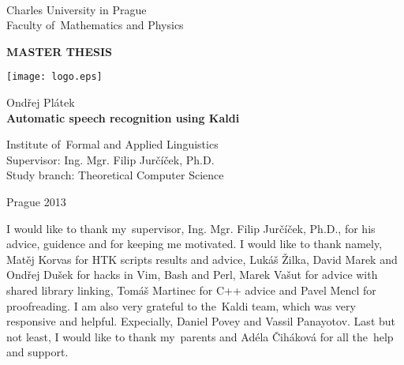 
\begin{titlepage}
\begin{center}
\ \\

\vspace{15mm}

\large
Charles University in Prague\\
Faculty of~Mathematics and Physics\\

\vspace{5mm}

{\Large\bf MASTER THESIS}

\vspace{15mm}

\texttt{[image: logo.eps]} %

\vspace{20mm}
{\Large Ondřej Plátek}\\ 

\vspace{5mm}
{\Large\bf Automatic speech recognition using Kaldi}

\vspace{20mm}
\large
\noindent
Institute of~Formal and Applied Linguistics\\
\noindent
Supervisor: Ing. Mgr. Filip Jurčíček, Ph.D.\\
\noindent
Study branch: Theoretical Computer Science\\
\end{center}
\vspace{20mm}
\begin{center}
Prague 2013
\end{center}

\end{titlepage} %

\newpage

\normalsize %
\vspace{10mm} 

\noindent I would like to thank my~supervisor, Ing. Mgr. Filip Jurčíček, Ph.D., for his advice, guidence and 
for keeping me motivated. 
I would like to thank namely, Matěj Korvas for HTK scripts results and advice, 
Lukáš Žilka, David Marek and Ondřej Dušek for hacks in Vim, Bash and Perl, 
Marek Vašut for advice with shared library linking, Tomáš Martinec for C++ advice
and Pavel Mencl for proofreading.
I am also very grateful to the~Kaldi team, which was very responsive and helpful.
Expecially, Daniel Povey and  Vassil Panayotov. 
Last but not least, I would like to thank my~parents and Adéla Čiháková for all the~help and support.


